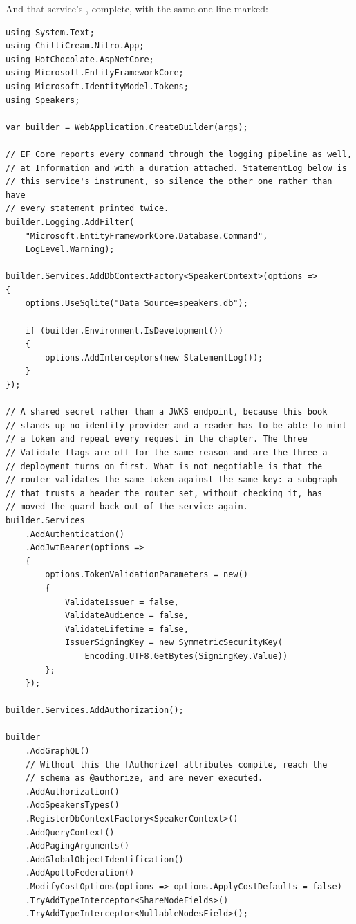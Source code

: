 %
And that service's , complete, with the same one line marked:

\begin{verbatim}
using System.Text;
using ChilliCream.Nitro.App;
using HotChocolate.AspNetCore;
using Microsoft.EntityFrameworkCore;
using Microsoft.IdentityModel.Tokens;
using Speakers;

var builder = WebApplication.CreateBuilder(args);

// EF Core reports every command through the logging pipeline as well,
// at Information and with a duration attached. StatementLog below is
// this service's instrument, so silence the other one rather than have
// every statement printed twice.
builder.Logging.AddFilter(
    "Microsoft.EntityFrameworkCore.Database.Command",
    LogLevel.Warning);

builder.Services.AddDbContextFactory<SpeakerContext>(options =>
{
    options.UseSqlite("Data Source=speakers.db");

    if (builder.Environment.IsDevelopment())
    {
        options.AddInterceptors(new StatementLog());
    }
});

// A shared secret rather than a JWKS endpoint, because this book
// stands up no identity provider and a reader has to be able to mint
// a token and repeat every request in the chapter. The three
// Validate flags are off for the same reason and are the three a
// deployment turns on first. What is not negotiable is that the
// router validates the same token against the same key: a subgraph
// that trusts a header the router set, without checking it, has
// moved the guard back out of the service again.
builder.Services
    .AddAuthentication()
    .AddJwtBearer(options =>
    {
        options.TokenValidationParameters = new()
        {
            ValidateIssuer = false,
            ValidateAudience = false,
            ValidateLifetime = false,
            IssuerSigningKey = new SymmetricSecurityKey(
                Encoding.UTF8.GetBytes(SigningKey.Value))
        };
    });

builder.Services.AddAuthorization();

builder
    .AddGraphQL()
    // Without this the [Authorize] attributes compile, reach the
    // schema as @authorize, and are never executed.
    .AddAuthorization()
    .AddSpeakersTypes()
    .RegisterDbContextFactory<SpeakerContext>()
    .AddQueryContext()
    .AddPagingArguments()
    .AddGlobalObjectIdentification()
    .AddApolloFederation()
    .ModifyCostOptions(options => options.ApplyCostDefaults = false)
    .TryAddTypeInterceptor<ShareNodeFields>()
    .TryAddTypeInterceptor<NullableNodesField>();


\end{verbatim}
